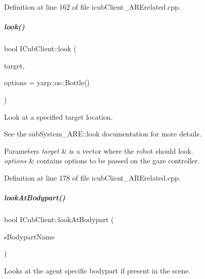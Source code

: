 Definition at line 162 of file icub\+Client\+\_\+\+A\+R\+Erelated.\+cpp.

\mbox{\label{group__icubclient__clients_a54af100e4707843e8e84d9e6c397e4fb}} 
\subparagraph{\texorpdfstring{look()}{look()}\hspace{0.1cm}{\footnotesize\ttfamily [2/2]}}
{\footnotesize\ttfamily bool I\+Cub\+Client\+::look (\begin{DoxyParamCaption}\item[{const yarp\+::sig\+::\+Vector\+Of$<$ double $>$ \&}]{target,  }\item[{const yarp\+::os\+::\+Bottle \&}]{options = {\ttfamily yarp\+:\+:os\+:\+:Bottle()} }\end{DoxyParamCaption})}



Look at a specified target location. 

See the sub\+System\+\_\+\+A\+R\+E\+::look documentation for more details. 
\begin{DoxyParams}{Parameters}
{\em target} & is a vector where the robot should look. \\
\hline
{\em options} & contains options to be passed on the gaze controller. \\
\hline
\end{DoxyParams}


Definition at line 178 of file icub\+Client\+\_\+\+A\+R\+Erelated.\+cpp.

\mbox{\label{group__icubclient__clients_aad1592c7eb0b276114fa564ceb20902a}} 
\subparagraph{\texorpdfstring{look\+At\+Bodypart()}{lookAtBodypart()}}
{\footnotesize\ttfamily bool I\+Cub\+Client\+::look\+At\+Bodypart (\begin{DoxyParamCaption}\item[{const std\+::string \&}]{s\+Bodypart\+Name }\end{DoxyParamCaption})}



Looks at the agent specific bodypart if present in the scene. 


